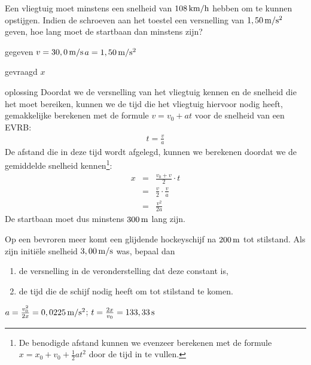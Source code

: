 \documentclass{ximera}
\begin{document}
\begin{exercise} Een vliegtuig moet minstens een snelheid van $108\rm\,km/h$ hebben om te kunnen opstijgen. Indien de schroeven aan het toestel een versnelling van $1,50\rm\,m/s^2$ geven, hoe lang moet de startbaan dan minstens zijn? 
\begin{oplossing}
\item[gegeven]$v=30,0\rm\,m/s$\newline$a=1,50\rm\,m/s^2$
\item[gevraagd]$x$
\item[oplossing]Doordat we de versnelling van het vliegtuig kennen en de snelheid die het moet bereiken, kunnen we de tijd die het vliegtuig hiervoor nodig heeft, gemakkelijke berekenen met de formule $v=v_0+at$ voor de snelheid van een EVRB:
\begin{eqnarray*}
t=\frac{v}{a}
\end{eqnarray*}
De afstand die in deze tijd wordt afgelegd, kunnen we berekenen doordat we de gemiddelde snelheid kennen\footnote{De benodigde afstand kunnen we evenzeer berekenen met de formule $x=x_0+v_0+\frac{1}{2}at^2$ door de tijd in te vullen.}:
\begin{eqnarray*}
x&=&\frac{v_0+v}{2}\cdot t\\
&=&\frac{v}{2}\cdot\frac{v}{a}\\
&=&\frac{v^2}{2a}
\end{eqnarray*}
De startbaan moet dus minstens $300\rm\,m$ lang zijn.
\end{oplossing}

\end{exercise}

\begin{exercise} Op een bevroren meer komt een glijdende hockeyschijf na $200\rm\,m$ tot stilstand. Als zijn initi\"ele snelheid $3,00\rm\,m/s$ was, bepaal dan
\begin{enumerate}
\item de versnelling in de veronderstelling dat deze constant is,
\item de tijd die de schijf nodig heeft om tot stilstand te komen.
\end{enumerate}
\begin{oplossing}
	$a=\frac{v_0^2}{2x}=0,0225\rm\,m/s^2$; $t=\frac{2x}{v_0}=133,33\rm\,s$
\end{oplossing}

\end{exercise}
\end{document}

